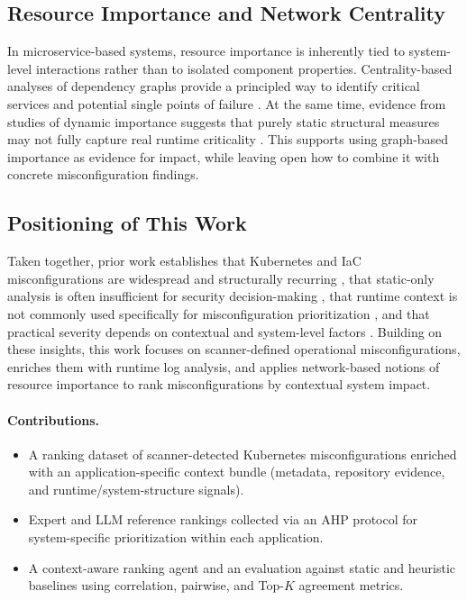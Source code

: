 \documentclass[12pt]{article}
\begin{document}
\subsection{Resource Importance and Network Centrality}
In microservice-based systems, resource importance is inherently tied to system-level interactions rather than to isolated component properties. Centrality-based analyses of dependency graphs provide a principled way to identify critical services and potential single points of failure \cite{bakhtin2025network,lerman2010centrality}. At the same time, evidence from studies of dynamic importance suggests that purely static structural measures may not fully capture real runtime criticality \cite{van2022dynamic}. This supports using graph-based importance as evidence for impact, while leaving open how to combine it with concrete misconfiguration findings.

\subsection{Positioning of This Work}
Taken together, prior work establishes that Kubernetes and IaC misconfigurations are widespread and structurally recurring \cite{rahman2018characteristics,rahman2018defect,rahman2019systematic}, that static-only analysis is often insufficient for security decision-making \cite{malul2024genkubesec,war2025detection}, that runtime context is not commonly used specifically for misconfiguration prioritization \cite{cohen2025kubeguard}, and that practical severity depends on contextual and system-level factors \cite{zhuang2016non,jiang2025survey,bakhtin2025network}. Building on these insights, this work focuses on scanner-defined operational misconfigurations, enriches them with runtime log analysis, and applies network-based notions of resource importance to rank misconfigurations by contextual system impact.

\paragraph{Contributions.}
\begin{itemize}
    \item A ranking dataset of scanner-detected Kubernetes misconfigurations enriched with an application-specific context bundle (metadata, repository evidence, and runtime/system-structure signals).
    \item Expert and LLM reference rankings collected via an AHP protocol for system-specific prioritization within each application.
    \item A context-aware ranking agent and an evaluation against static and heuristic baselines using correlation, pairwise, and Top-$K$ agreement metrics.
\end{itemize}
\end{document}
